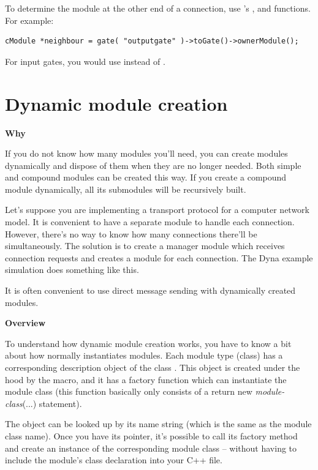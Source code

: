 To determine the module at the other end of a connection, use
's ,  and
 functions. For example:

\begin{Verbatim}
cModule *neighbour = gate( "outputgate" )->toGate()->ownerModule();
\end{Verbatim}


For input gates, you would use  instead of .





\section{Dynamic module creation}

\textbf{Why}


If you do not know how many modules you'll need, you can create
modules dynamically and dispose of them
when they are no longer needed. Both simple and compound modules
can be created this way. If you create a compound module dynamically,
all its submodules will be recursively built.


Let's suppose you are implementing a transport protocol for a 
computer network model. It is convenient to have a separate module 
to handle each connection. However, there's no way to know how 
many connections there'll be simultaneously. The solution is 
to create a manager module which receives connection requests 
and creates a module for each connection. The Dyna example simulation 
does something like this.

It is often convenient to use direct message sending with dynamically 
created modules.


\textbf{Overview }


To understand how dynamic module creation works, you have to know a
bit about how normally {\opp} instantiates modules. Each module type
(class) has a corresponding description object of the class
. This object is created under the hood by the
 macro, and it has a factory
function which can instantiate the module
class (this function basically only consists of a return new
\textit{module-class}(...)  statement).

The  object can be looked up by its name
string (which is the same as the module class name). Once you have its
pointer, it's possible to call its factory method and create an
instance of the corresponding module class -- without having to
include the module's class declaration into your C++ file.


